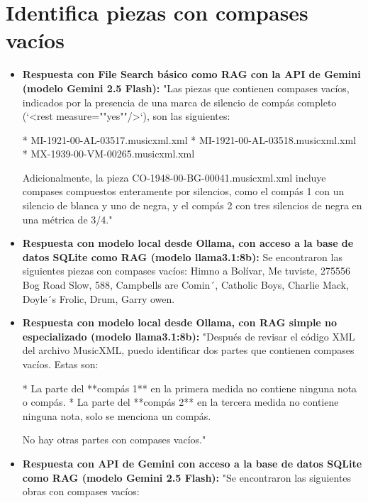\section{Identifica piezas con compases vacíos}
\begin{itemize}
    \item \textbf{Respuesta con File Search básico como RAG con la API de Gemini (modelo Gemini 2.5 Flash):} "Las piezas que contienen compases vacíos, indicados por la presencia de una marca de silencio de compás completo (`<rest measure=""yes""/>`), son las siguientes:

*   MI-1921-00-AL-03517.musicxml.xml
*   MI-1921-00-AL-03518.musicxml.xml
*   MX-1939-00-VM-00265.musicxml.xml

Adicionalmente, la pieza CO-1948-00-BG-00041.musicxml.xml incluye compases compuestos enteramente por silencios, como el compás 1 con un silencio de blanca y uno de negra, y el compás 2 con tres silencios de negra en una métrica de 3/4."
    \item \textbf{Respuesta con modelo local desde Ollama, con acceso a la base de datos SQLite como RAG (modelo llama3.1:8b):} Se encontraron las siguientes piezas con compases vacíos: Himno a Bolívar, Me tuviste, 275556 Bog Road Slow, 588, Campbells are Comin´, Catholic Boys, Charlie Mack, Doyle´s Frolic, Drum, Garry owen.
    \item \textbf{Respuesta con modelo local desde Ollama, con RAG simple no especializado (modelo llama3.1:8b):} "Después de revisar el código XML del archivo MusicXML, puedo identificar dos partes que contienen compases vacíos. Estas son:

*   La parte del **compás 1** en la primera medida no contiene ninguna nota o compás.
*   La parte del **compás 2** en la tercera medida no contiene ninguna nota, solo se menciona un compás.

No hay otras partes con compases vacíos."
\item \textbf{Respuesta con API de Gemini con acceso a la base de datos SQLite como RAG (modelo Gemini 2.5 Flash):} "Se encontraron las siguientes obras con compases vacíos:


\end{itemize}
